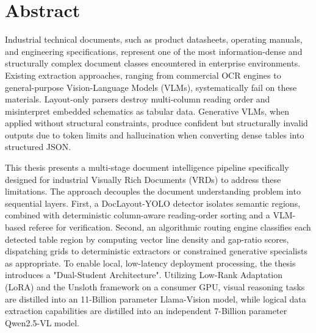 
\setcounter{tocdepth}{2}
\tableofcontents

\cleardoublepage

\section*{Abstract}

Industrial technical documents, such as product datasheets, operating manuals, and engineering specifications, represent one of the most information-dense and structurally complex document classes encountered in enterprise environments. Existing extraction approaches, ranging from commercial OCR engines to general-purpose Vision-Language Models (VLMs), systematically fail on these materials. Layout-only parsers destroy multi-column reading order and misinterpret embedded schematics as tabular data. Generative VLMs, when applied without structural constraints, produce confident but structurally invalid outputs due to token limits and hallucination when converting dense tables into structured JSON.

This thesis presents a multi-stage document intelligence pipeline specifically designed for industrial Visually Rich Documents (VRDs) to address these limitations. The approach decouples the document understanding problem into sequential layers. First, a DocLayout-YOLO detector isolates semantic regions, combined with deterministic column-aware reading-order sorting and a VLM-based referee for verification. Second, an algorithmic routing engine classifies each detected table region by computing vector line density and gap-ratio scores, dispatching grids to deterministic extractors or constrained generative specialists as appropriate. To enable local, low-latency deployment processing, the thesis introduces a "Dual-Student Architecture". Utilizing Low-Rank Adaptation (LoRA) and the Unsloth framework on a consumer GPU, visual reasoning tasks are distilled into an 11-Billion parameter Llama-Vision model, while logical data extraction capabilities are distilled into an independent 7-Billion parameter Qwen2.5-VL model.

